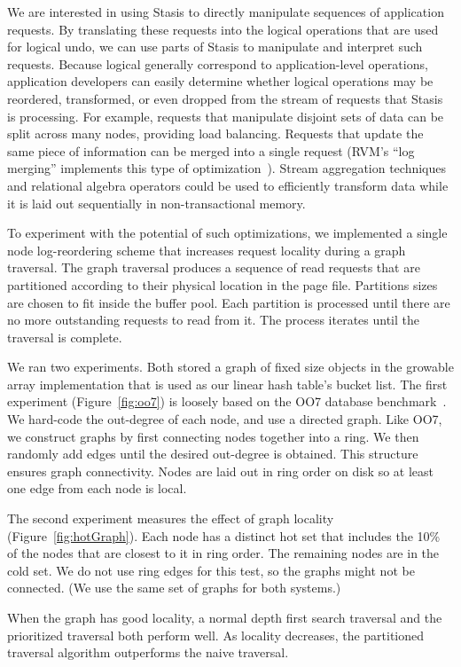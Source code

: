 \documentclass[letterpaper,twocolumn,10pt]{article}
\newcommand{\yad}{Stasis\xspace}
\begin{document}
We are interested in using \yad to directly manipulate sequences of
application requests.  By translating these requests into the logical
operations that are used for logical undo, we can use parts of \yad to
manipulate and interpret such requests.  Because logical generally
correspond to application-level operations, application developers can easily determine whether
logical operations may be reordered, transformed, or even dropped from
the stream of requests that \yad is processing.  For example,
requests that manipulate disjoint sets of data can be split across
many nodes, providing load balancing.  Requests that update the same piece of information
can be merged into a single request (RVM's ``log merging''
implements this type of optimization~\cite{lrvm}).  Stream aggregation
techniques and relational algebra operators could be used to
efficiently transform data while it is laid out sequentially in
non-transactional memory.

To experiment with the potential of such optimizations, we implemented
a single node log-reordering scheme that increases request locality
during a graph traversal.  The graph traversal produces a sequence of
read requests that are partitioned according to their physical
location in the page file.  Partitions sizes are chosen to fit inside
the buffer pool.  Each partition is processed until there are no more
outstanding requests to read from it.  The process iterates until the
traversal is complete.

We ran two experiments.  Both stored a graph of fixed size objects in
the growable array implementation that is used as our linear
hash table's bucket list.
The first experiment (Figure~\ref{fig:oo7})
is loosely based on the OO7 database benchmark~\cite{oo7}.  We
hard-code the out-degree of each node, and use a directed graph.  Like OO7, we
construct graphs by first connecting nodes together into a ring.
We then randomly add edges until the desired
out-degree is obtained.  This structure ensures graph connectivity.
Nodes are laid out in ring order on disk so at least
one edge from each node is local.

The second experiment measures the effect of graph locality
(Figure~\ref{fig:hotGraph}).  Each node has a distinct hot set that
includes the 10\% of the nodes that are closest to it in ring order.
The remaining nodes are in the cold set.  We do not use ring edges for
this test, so the graphs might not be connected. (We use the same set
of graphs for both systems.)

When the graph has good locality, a normal depth first search
traversal and the prioritized traversal both perform well.  As
locality decreases, the partitioned traversal algorithm outperforms
the naive traversal.
\end{document}

